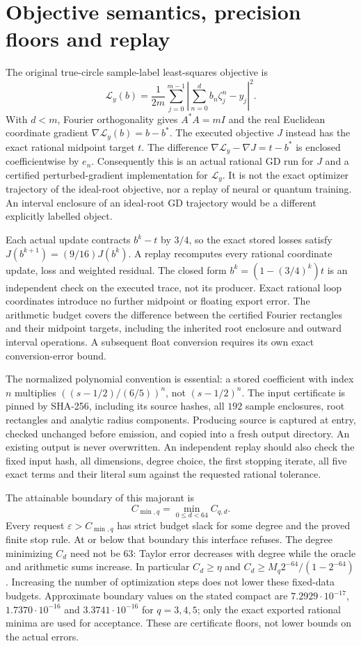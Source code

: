 \documentclass[11pt]{article}
\theoremstyle{definition}\newtheorem{definition}[theorem]{Definition}
\theoremstyle{remark}\newtheorem{remark}[theorem]{Remark}
\begin{document}
\section{Objective semantics, precision floors and replay}\label{ar:semantics}
The original true-circle sample-label least-squares objective is
\[
 \mathcal L_y(b)=\frac1{2m}\sum_{j=0}^{m-1}
 \left|\sum_{n=0}^d b_n\zeta_j^n-y_j\right|^2.
\]
With $d<m$, Fourier orthogonality gives $A^*A=mI$ and the real Euclidean
coordinate gradient $\nabla\mathcal L_y(b)=b-b^*$. The executed objective
$J$ instead has the exact rational midpoint target $t$.
The difference $\nabla\mathcal L_y-\nabla J=t-b^*$ is enclosed
coefficientwise by $e_n$.
Consequently this is an actual rational GD run for $J$ and a certified
perturbed-gradient implementation for $\mathcal L_y$. It is not the exact
optimizer trajectory of the ideal-root objective, nor a replay of neural or
quantum training. An interval enclosure of an ideal-root GD trajectory
would be a different explicitly labelled object.

Each actual update contracts $b^k-t$ by $3/4$, so the exact stored losses
satisfy $J(b^{k+1})=(9/16)J(b^k)$. A replay recomputes every rational
coordinate update, loss and weighted residual. The closed form
$b^k=(1-(3/4)^k)t$ is an independent check on the executed trace, not its
producer. Exact rational loop coordinates introduce no further midpoint or
floating export error. The arithmetic budget covers the difference between
the certified Fourier rectangles and their midpoint targets, including the
inherited root enclosure and outward interval operations. A subsequent
float conversion requires its own exact conversion-error bound.

The normalized polynomial convention is essential: a stored coefficient
with index $n$ multiplies $((s-1/2)/(6/5))^n$, not $(s-1/2)^n$.
The input certificate is pinned by SHA-256, including its source hashes,
all $192$ sample enclosures, root rectangles and analytic radius components.
Producing source is captured at entry, checked unchanged before emission,
and copied into a fresh output directory. An existing output is never
overwritten. An independent replay should also check the fixed input hash,
all dimensions, degree choice, the first stopping iterate, all five exact
terms and their literal sum against the requested rational tolerance.

The attainable boundary of this majorant is
\[
 C_{\min,q}=\min_{0\le d<64}C_{q,d}.
\]
Every request $\varepsilon>C_{\min,q}$ has strict budget slack for some
degree and the proved finite stop rule. At or below that boundary this
interface refuses. The degree minimizing $C_d$ need not be $63$:
Taylor error decreases with degree while the oracle and arithmetic sums
increase. In particular $C_d\ge\eta$ and
$C_d\ge M_q2^{-64}/(1-2^{-64})$. Increasing the number of optimization
steps does not lower these fixed-data budgets. Approximate boundary values
on the stated compact are $7.2929\cdot10^{-17}$,
$1.7370\cdot10^{-16}$ and $3.3741\cdot10^{-16}$ for $q=3,4,5$;
only the exact exported rational minima are used for acceptance.
These are certificate floors, not lower bounds on the actual errors.
\end{document}
